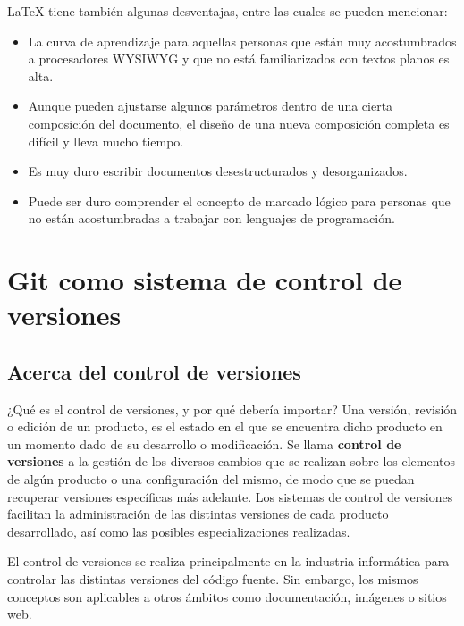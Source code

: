     LaTeX tiene también algunas desventajas, entre las cuales se pueden mencionar:
    
    \begin{itemize}
      \item La curva de aprendizaje para aquellas personas que están muy acostumbrados a procesadores WYSIWYG y que no está familiarizados con textos planos es alta.
      \item Aunque pueden ajustarse algunos parámetros dentro de una cierta composición del documento, el diseño de una nueva composición completa es difícil y lleva mucho tiempo.
      \item Es muy duro escribir documentos desestructurados y desorganizados.
      \item Puede ser duro comprender el concepto de marcado lógico para personas que no están acostumbradas a trabajar con lenguajes de programación.
    \end{itemize}
  

\section{Git como sistema de control de versiones}

\subsection{Acerca del control de versiones}
¿Qué es el control de versiones, y por qué debería importar? Una versión, revisión o edición de un producto, es el estado en el que se encuentra dicho producto en un momento dado de su desarrollo o modificación. Se llama {\bf control de versiones} a la gestión de los diversos cambios que se realizan sobre los elementos de algún producto o una configuración del mismo, de modo que se puedan recuperar versiones específicas más adelante. Los sistemas de control de versiones facilitan la administración de las distintas versiones de cada producto desarrollado, así como las posibles especializaciones realizadas.

El control de versiones se realiza principalmente en la industria informática para controlar las distintas versiones del código fuente. Sin embargo, los mismos conceptos son aplicables a otros ámbitos como documentación, imágenes o sitios web.


